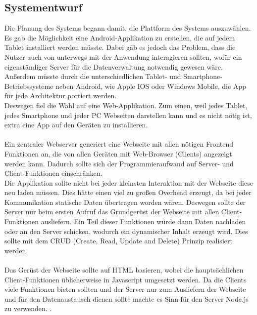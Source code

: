 \subsection{Systementwurf}\label{Systementwurf}
Die Planung des Systems begann damit, die Plattform des Systems auszuwählen. Es gab die Möglichkeit eine Android-Applikation zu erstellen, die auf jedem Tablet installiert werden müsste. Dabei gäb es jedoch das Problem, dass die Nutzer auch von unterwegs mit der Anwendung interagieren sollten, wofür ein eigenständiger Server für die Datenverwaltung notwendig gewesen wäre. Außerdem müsste durch die unterschiedlichen Tablet- und Smartphone-Betriebssysteme neben Android, wie Apple IOS oder Windows Mobile, die App für jede Architektur portiert werden.\\
Deswegen fiel die Wahl auf eine Web-Applikation. Zum einen, weil jedes Tablet, jedes Smartphone und jeder PC Webseiten darstellen kann und es nicht nötig ist, extra eine App auf den Geräten zu installieren.
\\ \\
Ein zentraler Webserver generiert eine Webseite mit allen nötigen Frontend Funktionen an, die von allen Geräten mit Web-Browser (Clients) angezeigt werden kann. Dadurch sollte sich der Programmieraufwand auf Server- und Client-Funktionen einschränken.\\
Die Applikation sollte nicht bei jeder kleinsten Interaktion mit der Webseite diese neu laden müssen. Dies hätte einen viel zu großen Overhead erzeugt, da bei jeder Kommunikation statische Daten übertragen worden wären.
Deswegen sollte der Server nur beim ersten Aufruf das Grundgerüst der Webseite mit allen Client-Funktionen ausliefern. Ein Teil dieser Funktionen würde dann Daten nachladen oder an den Server schicken, wodurch ein dynamischer Inhalt erzeugt wird.
Dies sollte mit dem CRUD (Create, Read, Update and Delete) Prinzip realisiert werden.\\
\\
Das Gerüst der Webseite sollte auf HTML basieren, wobei die hauptsächlichen Client-Funktionen üblicherweise in Javascript umgesetzt werden. Da die Clients viele Funktionen bieten sollten und der Server nur zum Ausliefern der Webseite und für den Datenaustausch dienen sollte machte es Sinn für den Server Node.js zu verwenden. \cite{nodejs:website}.

